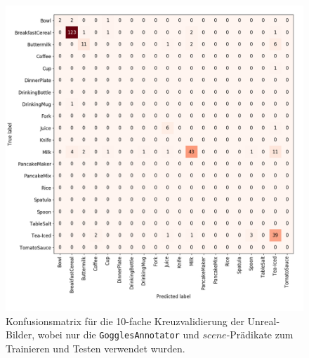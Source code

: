 \begin{figure}
\centering
	\includegraphics[scale=.27]{img/chapter6/UnrealGTClass_goggles.png}	
\caption[Konfusionsmatrix für die Klassifikation nur durch den \texttt{GogglesAnnotator}]{Konfusionsmatrix für die 10-fache Kreuzvalidierung der Unreal-Bilder, wobei nur die \texttt{GogglesAnnotator} und $scene$-Prädikate zum Trainieren und Testen verwendet wurden.}
\label{fig:singleEvidencesGog}
\end{figure}

